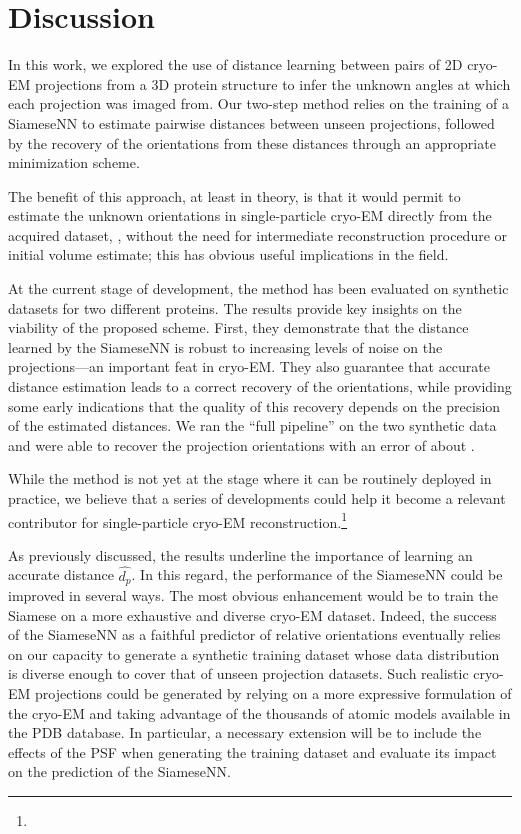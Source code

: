 \section{Discussion}
\label{sec:discussion}

In this work, we explored the use of distance learning between pairs of 2D cryo-EM projections from a 3D protein structure to infer the unknown angles at which each projection was imaged from. Our two-step method relies on the training of a SiameseNN to estimate pairwise distances between unseen projections, followed by the recovery of the orientations from these distances through an appropriate minimization scheme. 

The benefit of this approach, at least in theory, is that it would permit to estimate the unknown orientations in single-particle cryo-EM directly from the acquired dataset, \ie, without the need for intermediate reconstruction procedure or initial volume estimate; this has obvious useful implications in the field.  

At the current stage of development, the method has been evaluated on synthetic datasets for two different proteins. The results provide key insights on the viability of the proposed scheme. First, they demonstrate that the distance learned by the SiameseNN is robust to increasing levels of noise on the projections---an important feat in cryo-EM. They also guarantee that accurate distance estimation leads to a correct recovery of the orientations, while providing some early indications that the quality of this recovery depends on the precision of the estimated distances. We ran the ``full pipeline'' on the two synthetic data and were able to recover the projection orientations with an error of about . 

While the method is not yet at the stage where it can be routinely deployed in practice, we believe that a series of developments could help it become a relevant contributor for single-particle cryo-EM reconstruction.\footnote{} 

As previously discussed, the results underline the importance of learning an accurate distance $\widehat{d_p}$. In this regard, the performance of the SiameseNN could be improved in several ways. The most obvious enhancement would be to train the Siamese on a more exhaustive and diverse cryo-EM dataset. Indeed, the success of the SiameseNN as a faithful predictor of relative orientations eventually relies on our capacity to generate a synthetic training dataset whose data distribution is diverse enough to cover that of unseen projection datasets. Such realistic cryo-EM projections could be generated by relying on a more expressive formulation of the cryo-EM and taking advantage of the thousands of atomic models available in the PDB database. In particular, a necessary extension will be to include the effects of the PSF when generating the training dataset and evaluate its impact on the prediction of the SiameseNN. 

